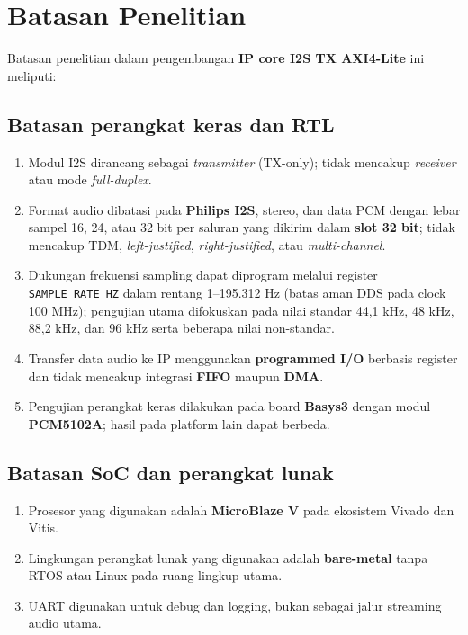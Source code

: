 \section{Batasan Penelitian}

Batasan penelitian dalam pengembangan \textbf{IP core I2S TX AXI4-Lite} ini meliputi:

\subsection{Batasan perangkat keras dan RTL}
\begin{enumerate}
	\item Modul I2S dirancang sebagai \textit{transmitter} (TX-only); tidak mencakup \textit{receiver} atau mode \textit{full-duplex}.
	\item Format audio dibatasi pada \textbf{Philips I2S}, stereo, dan data PCM dengan lebar sampel 16, 24, atau 32 bit per saluran yang dikirim dalam \textbf{slot 32 bit}; tidak mencakup TDM, \textit{left-justified}, \textit{right-justified}, atau \textit{multi-channel}.
	\item Dukungan frekuensi sampling dapat diprogram melalui register \texttt{SAMPLE\_RATE\_HZ} dalam rentang 1--195.312 Hz (batas aman DDS pada clock 100 MHz); pengujian utama difokuskan pada nilai standar 44,1 kHz, 48 kHz, 88,2 kHz, dan 96 kHz serta beberapa nilai non-standar.
	\item Transfer data audio ke IP menggunakan \textbf{programmed I/O} berbasis register dan tidak mencakup integrasi \textbf{FIFO} maupun \textbf{DMA}.
	\item Pengujian perangkat keras dilakukan pada board \textbf{Basys3} dengan modul \textbf{PCM5102A}; hasil pada platform lain dapat berbeda.
\end{enumerate}

\subsection{Batasan SoC dan perangkat lunak}
\begin{enumerate}
	\item Prosesor yang digunakan adalah \textbf{MicroBlaze V} pada ekosistem Vivado dan Vitis.
	\item Lingkungan perangkat lunak yang digunakan adalah \textbf{bare-metal} tanpa RTOS atau Linux pada ruang lingkup utama.
	\item UART digunakan untuk debug dan logging, bukan sebagai jalur streaming audio utama.
\end{enumerate}

